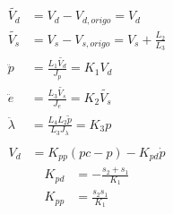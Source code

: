 \begin{subequations}\label{eq:lin_model}
	\begin{align}
        \tilde{V_d} &= V_d-V_{d,origo} = V_d\\
        \tilde{V_s} &= V_s-V_{s,origo} = V_s+\frac{L_2}{L_3}\\
		\ddot{p}  &= \frac{L_1\tilde{V_d}}{J_p} = K_1V_d\label{eq:lin_p} \\
		\ddot{e}  &= \frac{L_3\tilde{V_s}}{J_e} = K_2\tilde{V_s}\label{eq:lin_e} \\
		\ddot{\lambda} &= \frac{L_4L_2\tilde{p}}{L_3J_{\lambda}} = K_3p\label{eq:lin_l} \\
	\end{align}
\end{subequations}
\begin{subequations}\label{eq:PD}
	\begin{align}
        V_d &= K_{pp}(pc-p)-K_{pd}\dot{p}
	\end{align}
\end{subequations}
\begin{subequations}\label{eq:pole_place}
	\begin{align}
    K_{pd} &= -\frac{s_2+s_1}{K_1}\\
    K_{pp} &= \frac{s_2s_1}{K_1}
	\end{align}
\end{subequations}

